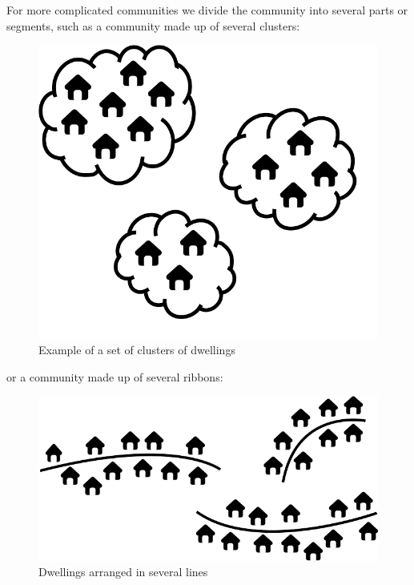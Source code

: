\documentclass[12pt,a4paper]{book}
\theoremstyle{definition}
\theoremstyle{definition}
\theoremstyle{definition}
\theoremstyle{remark}
\begin{document}
For more complicated communities we divide the community into several
parts or segments, such as a community made up of several clusters:

\begin{figure}[H]

{\centering \includegraphics[width=9.72in]{figures/stage2sample3} 

}

\caption{Example of a set of clusters of dwellings}\label{fig:sample17}
\end{figure}

or a community made up of several ribbons:

\begin{figure}[H]

{\centering \includegraphics[width=9.72in]{figures/stage2sample4} 

}

\caption{Dwellings arranged in several lines}\label{fig:sample18}
\end{figure}
\end{document}
